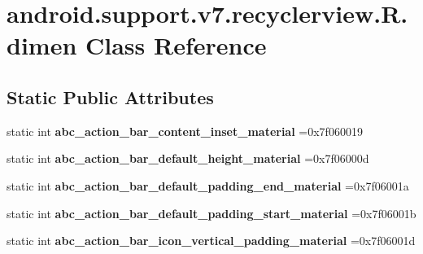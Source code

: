 \hypertarget{classandroid_1_1support_1_1v7_1_1recyclerview_1_1R_1_1dimen}{}\section{android.\+support.\+v7.\+recyclerview.\+R.\+dimen Class Reference}
\label{classandroid_1_1support_1_1v7_1_1recyclerview_1_1R_1_1dimen}
\subsection*{Static Public Attributes}
\begin{DoxyCompactItemize}
\item 
\mbox{\label{classandroid_1_1support_1_1v7_1_1recyclerview_1_1R_1_1dimen_aa14ab9cc8035077c5365997c1d806da1}} 
static int {\bfseries abc\+\_\+action\+\_\+bar\+\_\+content\+\_\+inset\+\_\+material} =0x7f060019
\item 
\mbox{\label{classandroid_1_1support_1_1v7_1_1recyclerview_1_1R_1_1dimen_a77cd75c2c3cfb31f1f6b9e353375a6f9}} 
static int {\bfseries abc\+\_\+action\+\_\+bar\+\_\+default\+\_\+height\+\_\+material} =0x7f06000d
\item 
\mbox{\label{classandroid_1_1support_1_1v7_1_1recyclerview_1_1R_1_1dimen_a49801e6804ab7d024d187f30dd6158e5}} 
static int {\bfseries abc\+\_\+action\+\_\+bar\+\_\+default\+\_\+padding\+\_\+end\+\_\+material} =0x7f06001a
\item 
\mbox{\label{classandroid_1_1support_1_1v7_1_1recyclerview_1_1R_1_1dimen_adbf09c681f19269aa0dcb8d6c705b277}} 
static int {\bfseries abc\+\_\+action\+\_\+bar\+\_\+default\+\_\+padding\+\_\+start\+\_\+material} =0x7f06001b
\item 
\mbox{\label{classandroid_1_1support_1_1v7_1_1recyclerview_1_1R_1_1dimen_aebb8fa2f267c91b6286bf2faef6a1d74}} 
static int {\bfseries abc\+\_\+action\+\_\+bar\+\_\+icon\+\_\+vertical\+\_\+padding\+\_\+material} =0x7f06001d

\end{DoxyCompactItemize}

